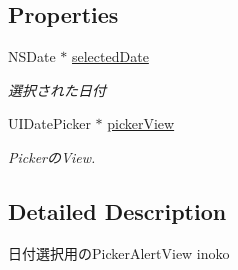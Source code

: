 \subsection*{Properties}
\begin{DoxyCompactItemize}
\item 
\hypertarget{interface_date_picker_alert_view_a9a714296cf7518255a62dd9917084417}{
NSDate $\ast$ \hyperlink{interface_date_picker_alert_view_a9a714296cf7518255a62dd9917084417}{selectedDate}}
\label{interface_date_picker_alert_view_a9a714296cf7518255a62dd9917084417}

\begin{DoxyCompactList}\small\item\em 選択された日付 \end{DoxyCompactList}\item 
\hypertarget{interface_date_picker_alert_view_aef627bb72c5b1603aca220ce421e14dc}{
UIDatePicker $\ast$ \hyperlink{interface_date_picker_alert_view_aef627bb72c5b1603aca220ce421e14dc}{pickerView}}
\label{interface_date_picker_alert_view_aef627bb72c5b1603aca220ce421e14dc}

\begin{DoxyCompactList}\small\item\em PickerのView. \end{DoxyCompactList}\end{DoxyCompactItemize}


\subsection{Detailed Description}
日付選択用のPickerAlertView  inoko 

